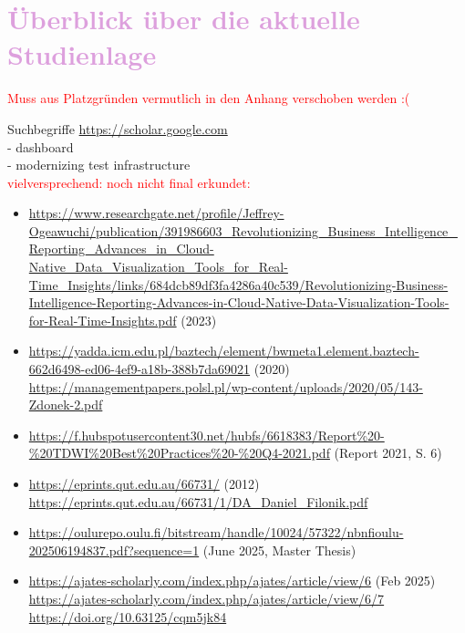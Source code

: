 \section{\textcolor{Plum}{Überblick über die aktuelle Studienlage}}
\label{ch:SdF:sec:Studienlage}

\textcolor{red}{Muss aus Platzgründen vermutlich in den Anhang verschoben werden :(}

\noindent
Suchbegriffe \url{https://scholar.google.com}\\
- dashboard\\
- modernizing test infrastructure\\

\noindent
\textcolor{red}{vielversprechend: noch nicht final erkundet:}
\begin{itemize}
    \item \url{https://www.researchgate.net/profile/Jeffrey-Ogeawuchi/publication/391986603_Revolutionizing_Business_Intelligence_Reporting_Advances_in_Cloud-Native_Data_Visualization_Tools_for_Real-Time_Insights/links/684dcb89df3fa4286a40c539/Revolutionizing-Business-Intelligence-Reporting-Advances-in-Cloud-Native-Data-Visualization-Tools-for-Real-Time-Insights.pdf} (2023)
    \item \url{https://yadda.icm.edu.pl/baztech/element/bwmeta1.element.baztech-662d6498-ed06-4ef9-a18b-388b7da69021} (2020)\\
          \url{https://managementpapers.polsl.pl/wp-content/uploads/2020/05/143-Zdonek-2.pdf}
    \item \url{https://f.hubspotusercontent30.net/hubfs/6618383/Report%20-%20TDWI%20Best%20Practices%20-%20Q4-2021.pdf} (Report 2021, S. 6)
    \item \url{https://eprints.qut.edu.au/66731/} (2012)\\
          \url{https://eprints.qut.edu.au/66731/1/DA_Daniel_Filonik.pdf}
    \item \url{https://oulurepo.oulu.fi/bitstream/handle/10024/57322/nbnfioulu-202506194837.pdf?sequence=1} (June 2025, Master Thesis)
    \item \url{https://ajates-scholarly.com/index.php/ajates/article/view/6} (Feb 2025)
          \url{https://ajates-scholarly.com/index.php/ajates/article/view/6/7}
          \url{https://doi.org/10.63125/cqm5jk84}
\end{itemize}

